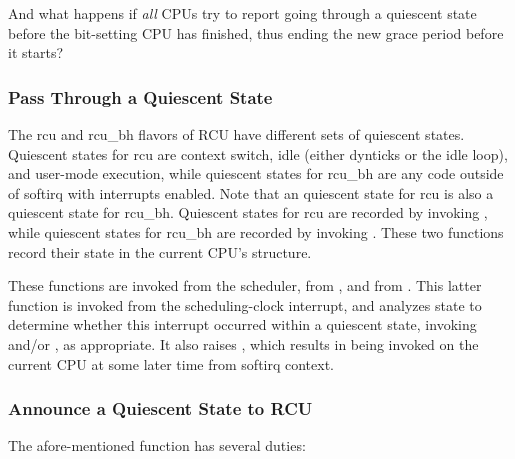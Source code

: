 \QuickQuiz{}
	And what happens if \emph{all} CPUs try to report going
	through a quiescent
	state before the bit-setting CPU has finished, thus ending the new
	grace period before it starts?
 \QuickQuizEnd

\subsubsection{Pass Through a Quiescent State}
\label{app:rcuimpl:rcutree:Pass Through a Quiescent State}

The rcu and rcu\_bh flavors of RCU have different sets of quiescent
states.
Quiescent states for rcu are context switch, idle (either dynticks or
the idle loop), and user-mode execution, while quiescent states for
rcu\_bh are any code outside of softirq with interrupts enabled.
Note that an quiescent state for rcu is also a quiescent state
for rcu\_bh.
Quiescent states for rcu are recorded by invoking ,
while quiescent states for rcu\_bh are recorded by invoking
.
These two functions record their state in the current CPU's
 structure.

These functions are invoked from the scheduler, from
, and from .
This latter function is invoked from the scheduling-clock interrupt,
and analyzes state to determine whether this interrupt occurred within
a quiescent state, invoking  and/or
, as appropriate.
It also raises , which results in
 being invoked on the current
CPU at some later time from softirq context.

\subsubsection{Announce a Quiescent State to RCU}
\label{app:rcuimpl:rcutree:Announce a Quiescent State to RCU}

The afore-mentioned  function
has several duties:

